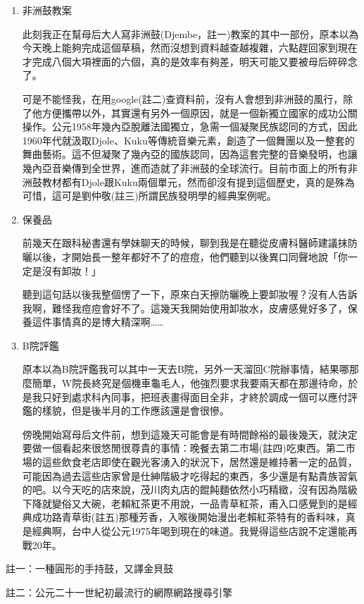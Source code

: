 \documentclass[
]{article}
\begin{document}
\begin{enumerate}
\def\labelenumi{\arabic{enumi}.}
\item
  非洲鼓教案

  此刻我正在幫母后大人寫非洲鼓(Djembe，註一)教案的其中一部份，原本以為今天晚上能夠完成這個草稿，然而沒想到資料越查越複雜，六點趕回家到現在才完成八個大項裡面的六個，真的是效率有夠差，明天可能又要被母后碎碎念了。

  可是不能怪我，在用google(註二)查資料前，沒有人會想到非洲鼓的風行，除了他方便攜帶以外，其實還有另外一個原因，就是一個新獨立國家的成功公關操作。公元1958年幾內亞脫離法國獨立，急需一個凝聚民族認同的方式，因此1960年代就汲取Djole、Kuku等傳統音樂元素，創造了一個舞團以及一整套的舞曲藝術。這不但凝聚了幾內亞的國族認同，因為這套完整的音樂發明，也讓幾內亞音樂傳到全世界，進而造就了非洲鼓的全球流行。目前市面上的所有非洲鼓教材都有Djole跟Kuku兩個單元，然而卻沒有提到這個歷史，真的是殊為可惜，這可是劉仲敬(註三)所謂民族發明學的經典案例呢。
\item
  保養品

  前幾天在跟科秘書還有學妹聊天的時候，聊到我是在聽從皮膚科醫師建議抹防曬以後，才開始長一整年都好不了的痘痘，他們聽到以後異口同聲地說「你一定是沒有卸妝！」

  聽到這句話以後我整個愣了一下，原來白天擦防曬晚上要卸妝喔？沒有人告訴我啊，難怪我痘痘會好不了。這幾天我開始使用卸妝水，皮膚感覺好多了，保養這件事情真的是博大精深啊\ldots\ldots{}
\item
  B院評鑑

  原本以為B院評鑑我可以其中一天去B院，另外一天溜回C院辦事情，結果哪那麼簡單，W院長終究是個機車龜毛人，他強烈要求我要兩天都在那邊待命，於是我只好到處求科內同事，把班表畫得面目全非，才終於調成一個可以應付評鑑的樣貌，但是後半月的工作應該還是會很慘。

  傍晚開始寫母后文件前，想到這幾天可能會是有時間餘裕的最後幾天，就決定要做一個看起來很悠閒很尊貴的事情：晚餐去第二市場(註四)吃東西。第二市場的這些飲食老店即使在觀光客湧入的狀況下，居然還是維持著一定的品質，可能因為過去這些店家曾是仕紳階級才吃得起的東西，多少還是有點貴族習氣的吧。以今天吃的店來說，茂川肉丸店的餛飩麵依然小巧精緻，沒有因為階級下降就變俗又大碗，老賴紅茶更不用說，一品青草紅茶，甫入口感覺到的是經典成功路青草街(註五)那種芳香，入喉後開始漫出老賴紅茶特有的香料味，真是經典啊，台中人從公元1975年喝到現在的味道。我覺得這些店說不定還能再戰20年。
\end{enumerate}

註一：一種圓形的手持鼓，又譯金貝鼓

註二：公元二十一世紀初最流行的網際網路搜尋引擎
\end{document}
